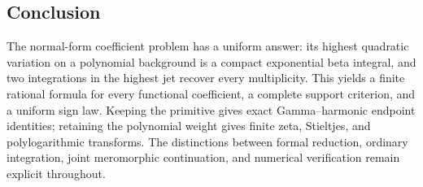 \documentclass[11pt,letterpaper]{article}
\numberwithin{equation}{section}
\theoremstyle{definition}\newtheorem{definition}[theorem]{Definition}
\theoremstyle{remark}\newtheorem{remark}[theorem]{Remark}
\begin{document}
\subsection*{Conclusion}
The normal-form coefficient problem has a uniform answer: its highest
quadratic variation on a polynomial background is a compact exponential
beta integral, and two integrations in the highest jet recover every
multiplicity. This yields a finite rational formula for every functional
coefficient, a complete support criterion, and a uniform sign law.
Keeping the primitive gives exact Gamma--harmonic endpoint identities;
retaining the polynomial weight gives finite zeta, Stieltjes, and
polylogarithmic transforms. The distinctions between formal reduction,
ordinary integration, joint meromorphic continuation, and numerical
verification remain explicit throughout.
\end{document}
